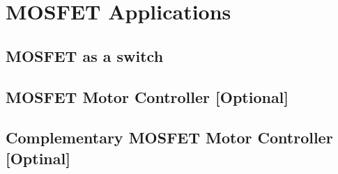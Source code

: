 \section{MOSFET Applications}
\subsection{MOSFET as a switch}
\subsection{MOSFET Motor Controller [Optional]}
\subsection{Complementary MOSFET Motor Controller [Optinal]}
